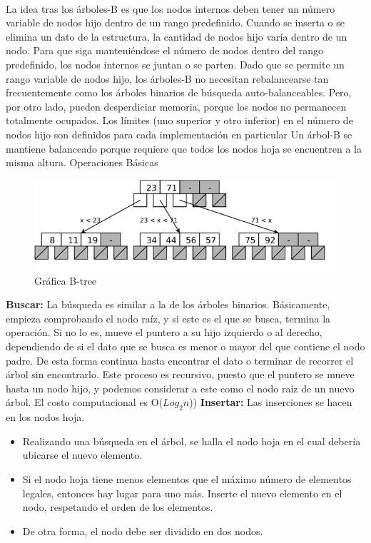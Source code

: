 \documentclass{article}
\begin{document}
            \paragraph{}
            La idea tras los árboles-B es que los nodos internos deben tener un número variable de nodos hijo dentro de un rango predefinido. Cuando se inserta o se elimina un dato de la estructura, la cantidad de nodos hijo varía dentro de un nodo. Para que siga manteniéndose el número de nodos dentro del rango predefinido, los nodos internos se juntan o se parten. Dado que se permite un rango variable de nodos hijo, los árboles-B no necesitan rebalancearse tan frecuentemente como los árboles binarios de búsqueda auto-balanceables. Pero, por otro lado, pueden desperdiciar memoria, porque los nodos no permanecen totalmente ocupados. Los límites (uno superior y otro inferior) en el número de nodos hijo son definidos para cada implementación en particular
            Un árbol-B se mantiene balanceado porque requiere que todos los nodos hoja se encuentren a la misma altura.
            Operaciones Básicas
                   \begin{figure}[htbp]
              \centering
              \includegraphics[width=\textwidth]{img/btree22.png}
              \caption{Gráfica B-tree}
              \label{fig:avlBusqueda}
            \end{figure}
            \textbf{Buscar:}
            La búsqueda es similar a la de los árboles binarios. Básicamente, empieza comprobando el nodo raíz, y si este es el que se busca, termina la operación. Si no lo es, mueve el puntero a su hijo izquierdo o al derecho, dependiendo de si el dato que se busca es menor o mayor del que contiene el nodo padre. De esta forma continua hasta encontrar el dato o terminar de recorrer el árbol sin encontrarlo. Este proceso es recursivo, puesto que el puntero se mueve hasta un nodo hijo, y podemos considerar a este como el nodo raíz de un nuevo árbol. El costo computacional es O($Log_2n$))
            \textbf{Insertar:}
            Las inserciones se hacen en los nodos hoja.
            \begin{itemize}
              \item  	Realizando una búsqueda en el árbol, se halla el nodo hoja en el cual debería ubicarse el nuevo elemento.
              \item Si el nodo hoja tiene menos elementos que el máximo número de elementos legales, entonces hay lugar para uno más. Inserte el nuevo elemento en el nodo, respetando el orden de los elementos.
              \item De otra forma, el nodo debe ser dividido en dos nodos.
            \end{itemize}
\end{document}
